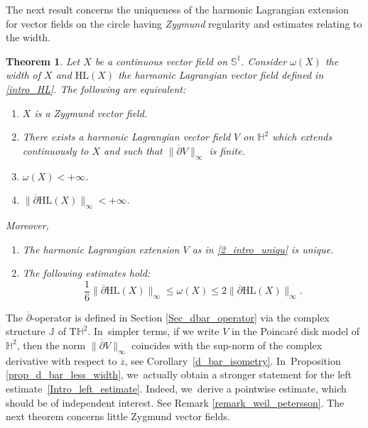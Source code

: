 \documentclass[JEP,XML,SOM,Unicode,NoEqCountersInSection, NoFloatCountersInSection,published]{cedram}
\newenvironment{enumeratei}
{\bgroup\def\theenumi{\roman{enumi}}\def\theenumii{\arabic{enumii}}\begin{enumerate}}
{\end{enumerate}\egroup}
\theoremstyle{plain}
\newtheorem{theorem}[cor]{Theorem}
\theoremstyle{definition}
\begin{document}
The next result concerns the uniqueness of the harmonic Lagrangian extension for vector fields on the circle having \emph{Zygmund} regularity and estimates relating to the width.
\begin{theorem}\label{intro_uniqu_HL}
Let $X$ be a continuous vector field on $\mathbb{S}^1$. Consider $\omega(X)$ the width of $X$ and $\mathrm{HL}(X)$ the harmonic Lagrangian vector field defined in \eqref{intro_HL}. The following are equivalent:
\begin{enumerate}
\item \label{1_intro_uniqu} $X$ is a Zygmund vector field.
\item \label{2_intro_uniqu} There exists a harmonic Lagrangian vector field $V$ on $\mathbb{H}^2$ which extends continuously to $X$ and such that $\lVert\overline{\partial} V \rVert_{\infty}$ is finite.
\item \label{3_intro_uniqu} $\omega(X)<+\infty$.
\item \label{4_intro_uniqu} $\lVert \overline{\partial}\mathrm{HL}(X)\rVert_{\infty}<+\infty$.
\end{enumerate}
Moreover,
\begin{enumeratei}
\item\label{Moreover_i} The harmonic Lagrangian extension $V$ as in \eqref{2_intro_uniqu} is unique.
\item\label{Moreover_ii} The following estimates hold:
\begin{equation}\label{Intro_left_estimate}
\frac{1}{6}\lVert \overline{\partial} \mathrm{HL}(X)\rVert_{\infty} \leq \omega(X) \leq 2\lVert \overline{\partial} \mathrm{HL}(X) \rVert_{\infty}.
\end{equation}
\end{enumeratei}
\end{theorem}
The \(\overline{\partial}\)-operator is defined in Section \ref{Sec_dbar_operator} via the complex structure \(\mathbb{J}\) of \(\mathrm{T}\mathbb{H}^2\). In~simpler terms, if we write \(V\) in the Poincaré disk model of \(\mathbb{H}^2\), then the norm \(\lVert\overline{\partial} V \rVert_{\infty}\) coincides with the sup-norm of the complex derivative with respect to \(\overline{z}\), see Corollary~\ref{d_bar_isometry}. In~Proposition \ref{prop_d_bar_less_width}, we~actually obtain a stronger statement for the left estimate~\eqref{Intro_left_estimate}. Indeed, we~derive a pointwise estimate, which should be of independent interest. See Remark \ref{remark_weil_petersson}. The next theorem concerns little Zygmund vector fields.
\end{document}
